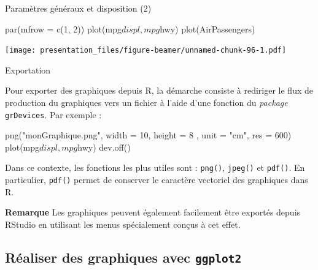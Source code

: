 \documentclass[12pt,handout,ignorenonframetext,]{beamer}
\newenvironment{Shaded}{}{}
\newcommand{\KeywordTok}[1]{\textcolor[rgb]{0.00,0.00,1.00}{{#1}}}
\newcommand{\DataTypeTok}[1]{{#1}}
\newcommand{\DecValTok}[1]{{#1}}
\newcommand{\StringTok}[1]{\textcolor[rgb]{0.00,0.50,0.50}{{#1}}}
\newcommand{\NormalTok}[1]{{#1}}
\renewenvironment{Shaded}{\begin{snugshade}}{\end{snugshade}}
\begin{document}
\begin{frame}[fragile]{Paramètres généraux et disposition (2)}

\begin{Shaded}
\begin{Highlighting}[]
\KeywordTok{par}\NormalTok{(}\DataTypeTok{mfrow =} \KeywordTok{c}\NormalTok{(}\DecValTok{1}\NormalTok{, }\DecValTok{2}\NormalTok{))}
\KeywordTok{plot}\NormalTok{(mpg$displ, mpg$hwy)}
\KeywordTok{plot}\NormalTok{(AirPassengers)}
\end{Highlighting}
\end{Shaded}

\texttt{[image: presentation\_files/figure-beamer/unnamed-chunk-96-1.pdf]}

\end{frame}

\begin{frame}[fragile]{Exportation}

Pour exporter des graphiques depuis R, la démarche consiste à rediriger
le flux de production du graphiques vers un fichier à l'aide d'une
fonction du \emph{package} \texttt{grDevices}. Par exemple :

\pause 

\begin{Shaded}
\begin{Highlighting}[]
\KeywordTok{png}\NormalTok{(}\StringTok{"monGraphique.png"}\NormalTok{, }\DataTypeTok{width =} \DecValTok{10}\NormalTok{, }\DataTypeTok{height =} \DecValTok{8}
    \NormalTok{, }\DataTypeTok{unit =} \StringTok{"cm"}\NormalTok{, }\DataTypeTok{res =} \DecValTok{600}\NormalTok{)}
\KeywordTok{plot}\NormalTok{(mpg$displ, mpg$hwy)}
\KeywordTok{dev.off}\NormalTok{()}
\end{Highlighting}
\end{Shaded}

\pause Dans ce contexte, les fonctions les plus utiles sont :
\texttt{png()}, \texttt{jpeg()} et \texttt{pdf()}. En particulier,
\texttt{pdf()} permet de conserver le caractère vectoriel des graphiques
dans R.

\pause 

\textbf{Remarque} Les graphiques peuvent également facilement être
exportés depuis RStudio en utilisant les menus spécialement conçus à cet
effet.

\end{frame}

\subsection{\texorpdfstring{Réaliser des graphiques avec
\protect\texttt{ggplot2}}{Réaliser des graphiques avec }}\label{realiser-des-graphiques-avec}
\end{document}
